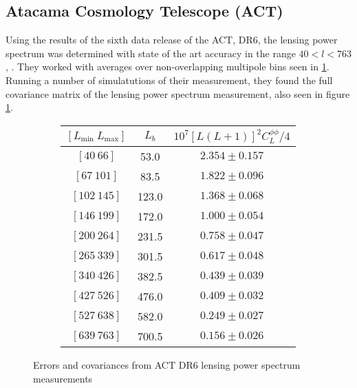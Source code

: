 \documentclass[11pt]{article} %
\begin{document}
\subsection{Atacama Cosmology Telescope (ACT)}
Using the results of the sixth data release of the ACT, DR6, the lensing power spectrum was determined with state of the art accuracy in the range $40<l<763$, \cite{ACT_lps_measurement} . They worked with averages over non-overlapping multipole bins seen in \ref{fig:act_lps_errors}. Running a number of simulatutions of their measurement, they found the full covariance matrix of the lensing power spectrum measurement, also seen in figure \ref{fig:act_lps_errors}.
\begin{figure}
\centering
\begin{subfigure}{0.45\textwidth}
    \begin{tabular}{ccc}
        \toprule
        \([L_{\text{min}} ~ L_{\text{max}}]\) & \( L_b \) & \( 10^7 [L(L+1)]^2 C_L^{\phi\phi} / 4 \) \\
        \midrule
        \([40 ~ 66]\)   & 53.0  & \( 2.354 \pm 0.157 \) \\
        \([67 ~ 101]\)  & 83.5  & \( 1.822 \pm 0.096 \) \\
        \([102 ~ 145]\) & 123.0 & \( 1.368 \pm 0.068 \) \\
        \([146 ~ 199]\) & 172.0 & \( 1.000 \pm 0.054 \) \\
        \([200 ~ 264]\) & 231.5 & \( 0.758 \pm 0.047 \) \\
        \([265 ~ 339]\) & 301.5 & \( 0.617 \pm 0.048 \) \\
        \([340 ~ 426]\) & 382.5 & \( 0.439 \pm 0.039 \) \\
        \([427 ~ 526]\) & 476.0 & \( 0.409 \pm 0.032 \) \\
        \([527 ~ 638]\) & 582.0 & \( 0.249 \pm 0.027 \) \\
        \([639 ~ 763]\) & 700.5 & \( 0.156 \pm 0.026 \) \\
        \bottomrule
    \end{tabular}
\end{subfigure}
\label{fig:act_lps_errors}
\caption{Errors and covariances from ACT DR6 lensing power spectrum measurements \cite{ACT_lps_measurement}}
\end{figure}
\end{document}
